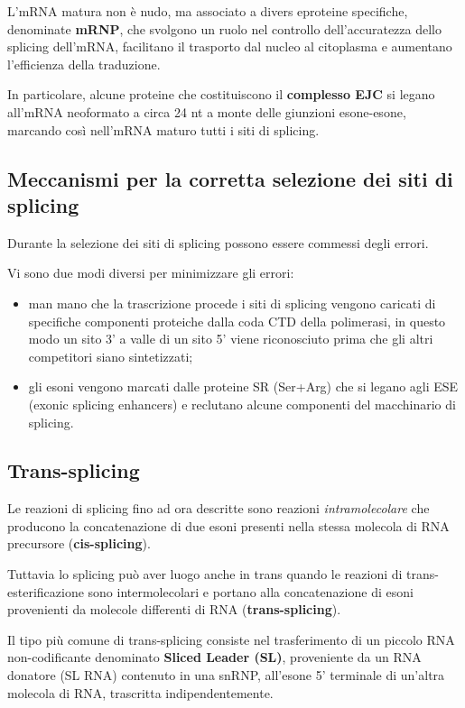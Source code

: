 \documentclass[11pt]{book}
\begin{document}
L'mRNA matura non è nudo, ma associato a divers eproteine specifiche,
denominate \textbf{mRNP}, che svolgono un ruolo nel controllo
dell'accuratezza dello splicing dell'mRNA, facilitano il trasporto dal
nucleo al citoplasma e aumentano l'efficienza della traduzione.

In particolare, alcune proteine che costituiscono il \textbf{complesso
EJC} si legano all'mRNA neoformato a circa 24 nt a monte delle giunzioni
esone-esone, marcando così nell'mRNA maturo tutti i siti di splicing.

\subsection{Meccanismi per la corretta selezione dei siti di
splicing}\label{meccanismi-per-la-corretta-selezione-dei-siti-di-splicing}

Durante la selezione dei siti di splicing possono essere commessi degli
errori.

Vi sono due modi diversi per minimizzare gli errori:

\begin{itemize}
\itemsep1pt\parskip0pt
\item
  man mano che la trascrizione procede i siti di splicing vengono
  caricati di specifiche componenti proteiche dalla coda CTD della
  polimerasi, in questo modo un sito 3' a valle di un sito 5' viene
  riconosciuto prima che gli altri competitori siano sintetizzati;
\item
  gli esoni vengono marcati dalle proteine SR (Ser+Arg) che si legano
  agli ESE (exonic splicing enhancers) e reclutano alcune componenti del
  macchinario di splicing.
\end{itemize}

\subsection{Trans-splicing}\label{trans-splicing}

Le reazioni di splicing fino ad ora descritte sono reazioni
\emph{intramolecolare} che producono la concatenazione di due esoni
presenti nella stessa molecola di RNA precursore
(\textbf{cis-splicing}).

Tuttavia lo splicing può aver luogo anche in trans quando le reazioni di
trans-esterificazione sono intermolecolari e portano alla concatenazione
di esoni provenienti da molecole differenti di RNA
(\textbf{trans-splicing}).

Il tipo più comune di trans-splicing consiste nel trasferimento di un
piccolo RNA non-codificante denominato \textbf{Sliced Leader (SL)},
proveniente da un RNA donatore (SL RNA) contenuto in una snRNP,
all'esone 5' terminale di un'altra molecola di RNA, trascritta
indipendentemente.
\end{document}
